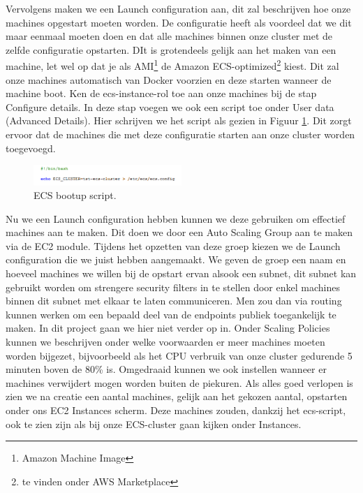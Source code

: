 \documentclass{article}
\begin{document}
	\par
	Vervolgens maken we een Launch configuration aan, dit zal beschrijven hoe onze machines opgestart moeten worden. De configuratie heeft als voordeel dat we dit maar eenmaal moeten doen en dat alle machines binnen onze cluster met de zelfde configuratie opstarten. DIt is grotendeels gelijk aan het maken van een machine, let wel op dat je als AMI\footnote{Amazon Machine Image} de Amazon ECS-optimized\footnote{te vinden onder AWS Marketplace} kiest. Dit zal onze machines automatisch van Docker voorzien en deze starten wanneer de machine boot. Ken de ecs-instance-rol toe aan onze machines bij de stap Configure details. In deze stap voegen we ook een script toe onder User data (Advanced Details). Hier schrijven we het script als gezien in Figuur \ref{fig:ecs-script}. Dit zorgt ervoor dat de machines die met deze configuratie starten aan onze cluster worden toegevoegd.
	\begin{figure}[h!]
		\centering
  		\includegraphics[width=0.5\textwidth]{images/ecs-script.PNG}
  		\caption{ECS bootup script.}
  		\label{fig:ecs-script}
	\end{figure}
	\par
	Nu we een Launch configuration hebben kunnen we deze gebruiken om effectief machines aan te maken. Dit doen we door een Auto Scaling Group aan te maken via de EC2 module. Tijdens het opzetten van deze groep kiezen we de Launch configuration die we juist hebben aangemaakt. We geven de groep een naam en hoeveel machines we willen bij de opstart ervan alsook een subnet, dit subnet kan gebruikt worden om strengere security filters in te stellen door enkel machines binnen dit subnet met elkaar te laten communiceren. Men zou dan via routing kunnen werken om een bepaald deel van de endpoints publiek toegankelijk te maken. In dit project gaan we hier niet verder op in. Onder Scaling Policies kunnen we beschrijven onder welke voorwaarden er meer machines moeten worden bijgezet, bijvoorbeeld als het CPU verbruik van onze cluster gedurende 5 minuten boven de 80\% is. Omgedraaid kunnen we ook instellen wanneer er machines verwijdert mogen worden buiten de piekuren. Als alles goed verlopen is zien we na creatie een aantal machines, gelijk aan het gekozen aantal, opstarten onder ons EC2 Instances scherm. Deze machines zouden, dankzij het ecs-script, ook te zien zijn als bij onze ECS-cluster gaan kijken onder Instances.
\end{document}

